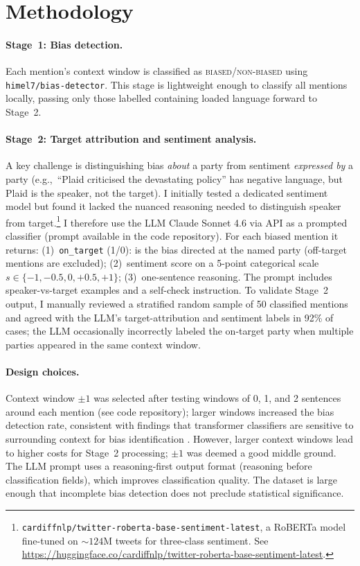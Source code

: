 \documentclass{article}
\begin{document}
\section{Methodology}

\paragraph{Stage~1: Bias detection.}
Each mention's context window is classified as \textsc{biased}/\textsc{non-biased} using \texttt{himel7/bias-detector}. This stage is lightweight enough to classify all mentions locally, passing only those labelled containing loaded language forward to Stage~2.

\paragraph{Stage~2: Target attribution and sentiment analysis.}
A key challenge is distinguishing bias \textit{about} a party from sentiment \textit{expressed by} a party (e.g.,\ ``Plaid criticised the devastating policy'' has negative language, but Plaid is the speaker, not the target). I initially tested a dedicated sentiment model but found it lacked the nuanced reasoning needed to distinguish speaker from target.\footnote{\texttt{cardiffnlp/twitter-roberta-base-sentiment-\allowbreak latest}, a RoBERTa model fine-tuned on ${\sim}124$M tweets for three-class sentiment. See \url{https://huggingface.co/cardiffnlp/twitter-roberta-base-sentiment-latest}.} I therefore use the LLM Claude Sonnet 4.6 \citep{anthropic2026} via API as a prompted classifier (prompt available in the code repository). For each biased mention it returns: (1)~\texttt{on\_target} (1/0): is the bias directed at the named party (off-target mentions are excluded); (2)~sentiment score on a 5-point categorical scale $s \in \{-1, -0.5, 0, +0.5, +1\}$; (3)~one-sentence reasoning. The prompt includes speaker-vs-target examples and a self-check instruction. To validate Stage~2 output, I manually reviewed a stratified random sample of 50 classified mentions and agreed with the LLM's target-attribution and sentiment labels in 92\% of cases; the LLM occasionally incorrectly labeled the on-target party when multiple parties appeared in the same context window.

\paragraph{Design choices.} Context window $\pm 1$ was selected after testing windows of 0, 1, and 2 sentences around each mention (see code repository); larger windows increased the bias detection rate, consistent with findings that transformer classifiers are sensitive to surrounding context for bias identification \citep{spinde2021}. However, larger context windows lead to higher costs for Stage~2 processing; $\pm 1$ was deemed a good middle ground. The LLM prompt uses a reasoning-first output format (reasoning before classification fields), which improves classification quality. The dataset is large enough that incomplete bias detection does not preclude statistical significance.
\end{document}
